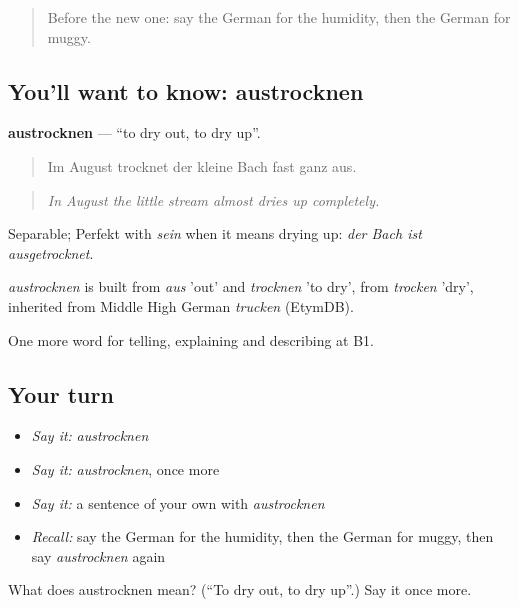 \label{lesson:GE-C464-austrocknen}



\begin{quote}
Before the new one: say the German for the humidity, then the German for muggy.
\end{quote}

\subsection*{You'll want to know: austrocknen}
\textbf{austrocknen} — \textquotedblleft{}to dry out, to dry up\textquotedblright{}.

\begin{quote}
Im August trocknet der kleine Bach fast ganz aus.
\end{quote}

\begin{quote}
\emph{In August the little stream almost dries up completely.}
\end{quote}

Separable; Perfekt with \emph{sein} when it means drying up: \emph{der Bach ist ausgetrocknet}.

\begin{cousinweb}
\emph{austrocknen} is built from \emph{aus} 'out' and \emph{trocknen} 'to dry', from \emph{trocken} 'dry', inherited from Middle High German \emph{trucken} (EtymDB).
\end{cousinweb}

\begin{grammarlens}[title={What you've built}]
One more word for telling, explaining and describing at B1.
\end{grammarlens}

\subsection*{Your turn}
\begin{itemize}
\raggedright
  \item \emph{Say it:} \emph{austrocknen}
  \item \emph{Say it:} \emph{austrocknen}, once more
  \item \emph{Say it:} a sentence of your own with \emph{austrocknen}
  \item \emph{Recall:} say the German for the humidity, then the German for muggy, then say \emph{austrocknen} again
\end{itemize}

\begin{tcolorbox}[breakable,colback=teal!4,colframe=teal!35!black,title={Before you move on}]
What does austrocknen mean? (\textquotedblleft{}To dry out, to dry up\textquotedblright{}.) Say it once more.
\end{tcolorbox}
